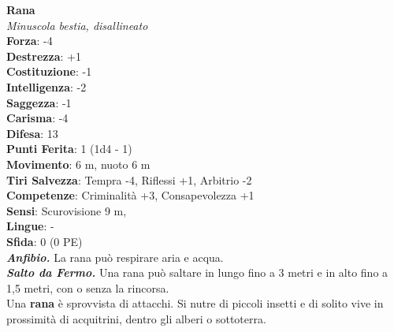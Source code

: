 \begin{multicols}{2}
\medskip\textbf{Rana}\\
\emph{Minuscola bestia, disallineato}\\
\textbf{Forza}: -4\\
\textbf{Destrezza}: +1\\
\textbf{Costituzione}: -1\\
\textbf{Intelligenza}: -2\\
\textbf{Saggezza}: -1\\
\textbf{Carisma}: -4\\
\textbf{Difesa}: 13\\
\textbf{Punti Ferita}: 1 (1d4 - 1)\\
\textbf{Movimento}: 6 m, nuoto 6 m\\
\textbf{Tiri Salvezza}:  Tempra -4, Riflessi +1, Arbitrio -2 \\
\textbf{Competenze}: Criminalità +3, Consapevolezza +1\\
\textbf{Sensi}: Scurovisione 9 m, \\
\textbf{Lingue}: -\\
\textbf{Sfida}: 0 (0 PE)\smallskip\\
\emph{\textbf{Anfibio.}} La rana può respirare aria e acqua.\\
\emph{\textbf{Salto da Fermo.}} Una rana può saltare in lungo fino a 3 metri e in alto fino a 1,5 metri, con o senza la rincorsa.\\
Una \textbf{rana} è sprovvista di attacchi. Si nutre di piccoli insetti e di solito vive in prossimità di acquitrini, dentro gli alberi o sottoterra.\\


\end{multicols}
